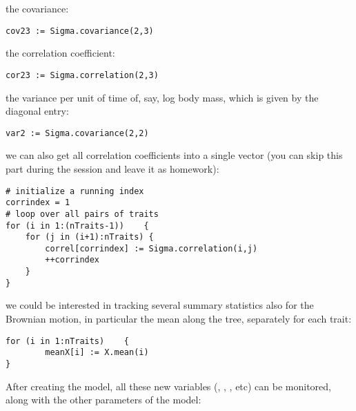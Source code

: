 the covariance:
{\tt \small \begin{snugshade*}
\begin{lstlisting}
cov23 := Sigma.covariance(2,3)
\end{lstlisting}
\end{snugshade*}}
the correlation coefficient:
{\tt \small \begin{snugshade*}
\begin{lstlisting}
cor23 := Sigma.correlation(2,3)
\end{lstlisting}
\end{snugshade*}}
the variance per unit of time of, say, log body mass, which is given by the diagonal entry:
{\tt \small \begin{snugshade*}
\begin{lstlisting}
var2 := Sigma.covariance(2,2)
\end{lstlisting}
\end{snugshade*}}
we can also get all correlation coefficients into a single vector (you can skip this part during the session and leave it as  homework):
{\tt \small \begin{snugshade*}
\begin{lstlisting}
# initialize a running index
corrindex = 1
# loop over all pairs of traits
for (i in 1:(nTraits-1))    {
    for (j in (i+1):nTraits) {
        correl[corrindex] := Sigma.correlation(i,j)
        ++corrindex
    }
}
\end{lstlisting}
\end{snugshade*}}
we could be interested in tracking several summary statistics also for the Brownian motion, in particular the mean along the tree, separately for each trait:
{\tt \small \begin{snugshade*}
\begin{lstlisting}
for (i in 1:nTraits)    {
        meanX[i] := X.mean(i)
}
\end{lstlisting}
\end{snugshade*}}

After creating the model, all these new variables (, , , etc) can be monitored, along with the other parameters of the model:

